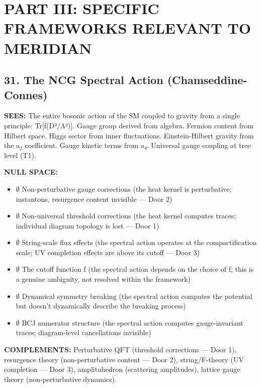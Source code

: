 \bigskip\noindent\makebox[\textwidth]{\color{rulegray}\rule{5cm}{0.3pt}}\bigskip


\chapter*{PART III: SPECIFIC FRAMEWORKS RELEVANT TO MERIDIAN}


\section*{31. The NCG Spectral Action (Chamseddine-Connes)}


\textbf{SEES:} The entire bosonic action of the SM coupled to gravity from a single principle: Tr[f(D²/Λ²)]. Gauge group derived from algebra. Fermion content from Hilbert space. Higgs sector from inner fluctuations. Einstein-Hilbert gravity from the a$_2$ coefficient. Gauge kinetic terms from a₄. Universal gauge coupling at tree level (T1).


\textbf{NULL SPACE:}

\begin{itemize}[nosep,leftmargin=*]
  \item $\emptyset$ Non-perturbative gauge corrections (the heat kernel is perturbative; instantons, resurgence content invisible — Door 2)
  \item $\emptyset$ Non-universal threshold corrections (the heat kernel computes traces; individual diagram topology is lost — Door 1)
  \item $\emptyset$ String-scale flux effects (the spectral action operates at the compactification scale; UV completion effects are above its cutoff — Door 3)
  \item $\emptyset$ The cutoff function f (the spectral action depends on the choice of f; this is a genuine ambiguity, not resolved within the framework)
  \item $\emptyset$ Dynamical symmetry breaking (the spectral action computes the potential but doesn't dynamically describe the breaking process)
  \item $\emptyset$ BCJ numerator structure (the spectral action computes gauge-invariant traces; diagram-level cancellations invisible)
\end{itemize}


\textbf{COMPLEMENTS:} Perturbative QFT (threshold corrections — Door 1), resurgence theory (non-perturbative content — Door 2), string/F-theory (UV completion — Door 3), amplituhedron (scattering amplitudes), lattice gauge theory (non-perturbative dynamics).


